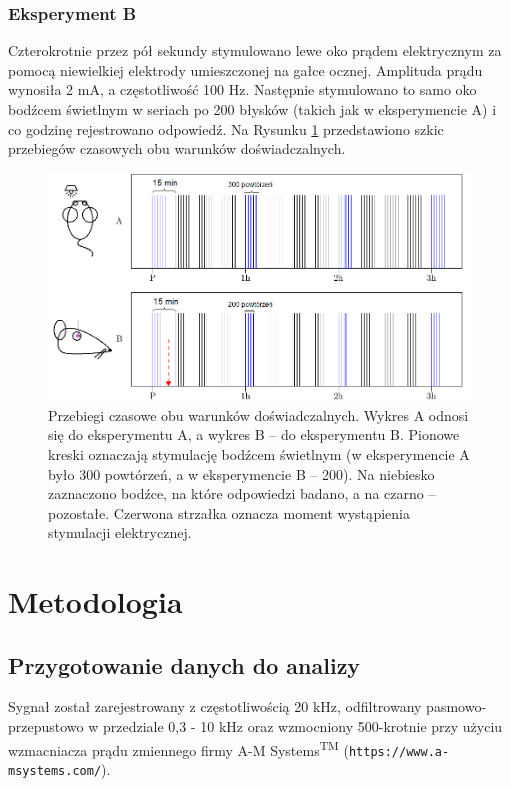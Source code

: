 \documentclass{pracamgr}
\begin{document}
	\subsection{Eksperyment B}
	Czterokrotnie przez pół sekundy stymulowano lewe oko prądem elektrycznym za pomocą niewielkiej elektrody umieszczonej na gałce ocznej. Amplituda prądu wynosiła 2 mA, a częstotliwość 100 Hz. Następnie stymulowano to samo oko bodźcem świetlnym w seriach po 200 błysków (takich jak w eksperymencie A) i co godzinę rejestrowano odpowiedź.
	\FloatBarrier
	Na Rysunku \ref{rys:porownanie_paradygmatow} przedstawiono szkic przebiegów czasowych obu warunków doświadczalnych. 
	\begin{figure}
		\begin{center}
			\includegraphics[width=\columnwidth]{przebieg.png}
		\end{center}
		\caption{Przebiegi czasowe obu warunków doświadczalnych. Wykres A odnosi się do eksperymentu A, a wykres B -- do eksperymentu B. Pionowe kreski oznaczają stymulację bodźcem świetlnym (w eksperymencie A było 300 powtórzeń, a w eksperymencie B -- 200). Na niebiesko zaznaczono bodźce, na które odpowiedzi badano, a na czarno -- pozostałe. Czerwona strzałka oznacza moment wystąpienia stymulacji elektrycznej.}
		\label{rys:porownanie_paradygmatow}
	\end{figure}
	\FloatBarrier
	
	\chapter{Metodologia}
	\section{Przygotowanie danych do analizy}
	Sygnał został zarejestrowany z częstotliwością 20 kHz, odfiltrowany pasmowo-przepustowo w przedziale 0,3 - 10 kHz oraz wzmocniony 500-krotnie przy użyciu wzmacniacza prądu zmiennego firmy A-M Systems\textsuperscript{TM} (\texttt{https://www.a-msystems.com/}).
	
\end{document}
